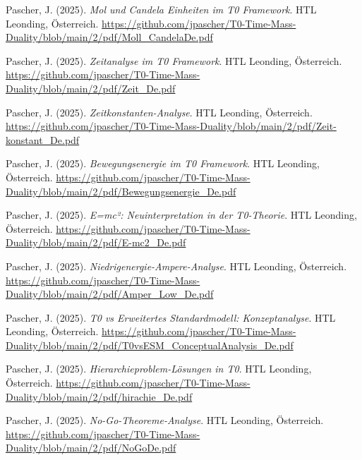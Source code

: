 \documentclass{article}
\begin{document}
\begin{thebibliography}{99}
		Pascher, J. (2025).
		\textit{Mol und Candela Einheiten im T0 Framework}.
		HTL Leonding, Österreich.
		\url{https://github.com/jpascher/T0-Time-Mass-Duality/blob/main/2/pdf/Moll_CandelaDe.pdf}
		
		
		Pascher, J. (2025).
		\textit{Zeitanalyse im T0 Framework}.
		HTL Leonding, Österreich.
		\url{https://github.com/jpascher/T0-Time-Mass-Duality/blob/main/2/pdf/Zeit_De.pdf}
		
		Pascher, J. (2025).
		\textit{Zeitkonstanten-Analyse}.
		HTL Leonding, Österreich.
		\url{https://github.com/jpascher/T0-Time-Mass-Duality/blob/main/2/pdf/Zeit-konstant_De.pdf}
		
		Pascher, J. (2025).
		\textit{Bewegungsenergie im T0 Framework}.
		HTL Leonding, Österreich.
		\url{https://github.com/jpascher/T0-Time-Mass-Duality/blob/main/2/pdf/Bewegungsenergie_De.pdf}
		
		Pascher, J. (2025).
		\textit{E=mc²: Neuinterpretation in der T0-Theorie}.
		HTL Leonding, Österreich.
		\url{https://github.com/jpascher/T0-Time-Mass-Duality/blob/main/2/pdf/E-mc2_De.pdf}
		
		Pascher, J. (2025).
		\textit{Niedrigenergie-Ampere-Analyse}.
		HTL Leonding, Österreich.
		\url{https://github.com/jpascher/T0-Time-Mass-Duality/blob/main/2/pdf/Amper_Low_De.pdf}
		
		
		Pascher, J. (2025).
		\textit{T0 vs Erweitertes Standardmodell: Konzeptanalyse}.
		HTL Leonding, Österreich.
		\url{https://github.com/jpascher/T0-Time-Mass-Duality/blob/main/2/pdf/T0vsESM_ConceptualAnalysis_De.pdf}
		
		Pascher, J. (2025).
		\textit{Hierarchieproblem-Lösungen in T0}.
		HTL Leonding, Österreich.
		\url{https://github.com/jpascher/T0-Time-Mass-Duality/blob/main/2/pdf/hirachie_De.pdf}
		
		Pascher, J. (2025).
		\textit{No-Go-Theoreme-Analyse}.
		HTL Leonding, Österreich.
		\url{https://github.com/jpascher/T0-Time-Mass-Duality/blob/main/2/pdf/NoGoDe.pdf}
		

\end{thebibliography}
\end{document}
